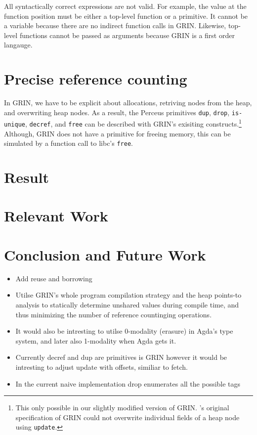 \documentclass{article}
\begin{document}
All syntactically correct expressions are not valid. For example, the value at the function 
position must be either a top-level function or a primitive. It cannot be a variable because
there are no indirect function calls in GRIN. Likewise, top-level functions cannot be passed 
as arguments because GRIN is a first order langauge.

\section{Precise reference counting}

In GRIN, we have to be explicit about allocations, retriving nodes from the heap, and overwriting heap nodes.
As a result, the Perceus primitives \texttt{dup}, \texttt{drop}, \texttt{is-unique}, \texttt{decref}, and \texttt{free} 
can be described with GRIN's exisiting constructs.\footnote{This only possible in our slightly modified version of 
GRIN. \citeauthor{boquist1999}'s original specification of GRIN could not overwrite individual fields of a heap node 
using \texttt{update}.}
Although, GRIN does not have a primitive for freeing memory, this can be simulated by a function call 
to libc's \texttt{free}.
 


\section{Result}

\section{Relevant Work}

\section{Conclusion and Future Work}
\begin{itemize}
\item Add reuse and borrowing
\item Utilse GRIN's whole program compilation strategy and the heap points-to analysis to statically determine unshared values during compile time, and thus minimizing the number of reference countinging operations.
\item It would also be intresting to utilse 0-modality (erasure) in Agda's type system, and later also 1-modality when Agda gets it.
\item Currently decref and dup are primitives is GRIN however it would be intresting to adjust update
      with offsets, similiar to fetch.
\item In the current naive implementation drop enumerates all the possible tags 
\end{itemize}


\printbibliography
\end{document}
